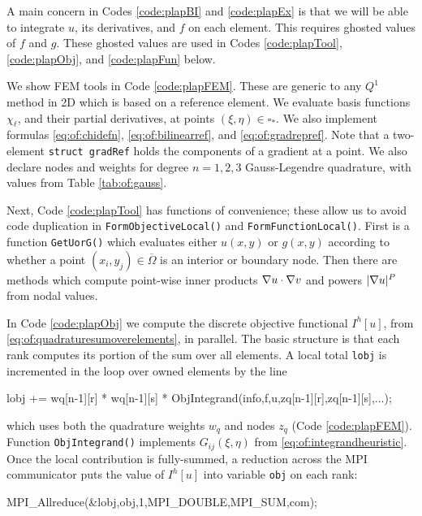 A main concern in Codes \ref{code:plapBI} and \ref{code:plapEx} is that we will be able to integrate $u$, its derivatives, and $f$ on each element.  This requires ghosted values of $f$ and $g$.  These ghosted values are used in Codes \ref{code:plapTool}, \ref{code:plapObj}, and \ref{code:plapFun} below.


We show FEM tools in Code \ref{code:plapFEM}.  These are generic to any $Q^1$ method in 2D which is based on a reference element.  We evaluate basis functions $\chi_\ell$, and their partial derivatives, at points $(\xi,\eta) \in \square_\ast$.  We also implement formulas \eqref{eq:of:chidefn}, \eqref{eq:of:bilinearref}, and \eqref{eq:of:gradrepref}.  Note that a two-element \texttt{struct gradRef} holds the components of a gradient at a point.  We also declare nodes and weights for degree $n=1,2,3$ Gauss-Legendre quadrature, with values from Table \ref{tab:of:gauss}.


Next, Code \ref{code:plapTool} has functions of convenience; these allow us to avoid code duplication in \texttt{FormObjectiveLocal()} and \texttt{FormFunctionLocal()}.  First is a function \texttt{GetUorG()} which evaluates either $u(x,y)$ or $g(x,y)$ according to whether a point $(x_i,y_j)\in\overline\Omega$ is an interior or boundary node.  Then there are methods which compute point-wise inner products $\nabla u\cdot \nabla v$ and powers $|\nabla u|^P$ from nodal values.


In Code \ref{code:plapObj} we compute the discrete objective functional $I^h[u]$, from \eqref{eq:of:quadraturesumoverelements}, in parallel.  The basic structure is that each rank computes its portion of the sum over all elements.  A local total \texttt{lobj} is incremented in the loop over owned elements by the line
\begin{code}
    lobj += wq[n-1][r] * wq[n-1][s] * ObjIntegrand(info,f,u,zq[n-1][r],zq[n-1][s],...);
\end{code}
which uses both the quadrature weights $w_q$ and nodes $z_q$ (Code \ref{code:plapFEM}).  Function \texttt{ObjIntegrand()} implements $G_{ij}(\xi,\eta)$ from \eqref{eq:of:integrandheuristic}.  Once the local contribution is fully-summed, a reduction across the MPI communicator puts the value of $I^h[u]$ into variable \texttt{obj} on each rank:
\begin{code}
    MPI_Allreduce(&lobj,obj,1,MPI_DOUBLE,MPI_SUM,com);
\end{code}

